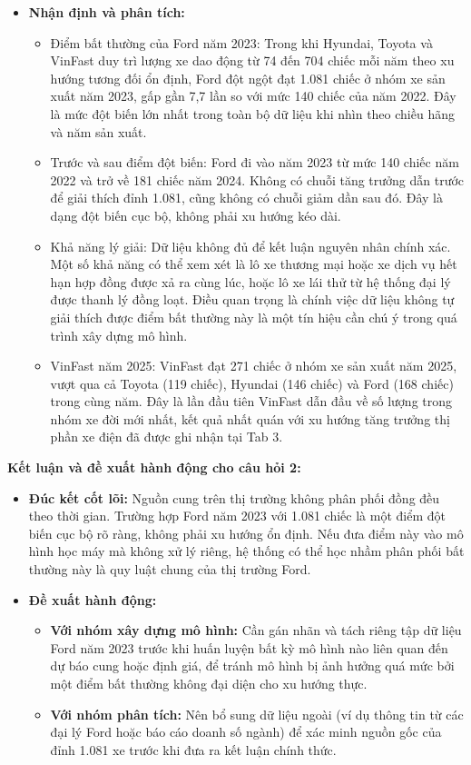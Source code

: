 \begin{itemize}
    \item \textbf{Nhận định và phân tích:}
    \begin{itemize}
        \item Điểm bất thường của Ford năm 2023: Trong khi Hyundai, Toyota và VinFast duy trì lượng xe dao động từ 74 đến 704 chiếc mỗi năm theo xu hướng tương đối ổn định, Ford đột ngột đạt 1.081 chiếc ở nhóm xe sản xuất năm 2023, gấp gần 7,7 lần so với mức 140 chiếc của năm 2022. Đây là mức đột biến lớn nhất trong toàn bộ dữ liệu khi nhìn theo chiều hãng và năm sản xuất.
        \item Trước và sau điểm đột biến: Ford đi vào năm 2023 từ mức 140 chiếc năm 2022 và trở về 181 chiếc năm 2024. Không có chuỗi tăng trưởng dẫn trước để giải thích đỉnh 1.081, cũng không có chuỗi giảm dần sau đó. Đây là dạng đột biến cục bộ, không phải xu hướng kéo dài.
        \item Khả năng lý giải: Dữ liệu không đủ để kết luận nguyên nhân chính xác. Một số khả năng có thể xem xét là lô xe thương mại hoặc xe dịch vụ hết hạn hợp đồng được xả ra cùng lúc, hoặc lô xe lái thử từ hệ thống đại lý được thanh lý đồng loạt. Điều quan trọng là chính việc dữ liệu không tự giải thích được điểm bất thường này là một tín hiệu cần chú ý trong quá trình xây dựng mô hình.
        \item VinFast năm 2025: VinFast đạt 271 chiếc ở nhóm xe sản xuất năm 2025, vượt qua cả Toyota (119 chiếc), Hyundai (146 chiếc) và Ford (168 chiếc) trong cùng năm. Đây là lần đầu tiên VinFast dẫn đầu về số lượng trong nhóm xe đời mới nhất, kết quả nhất quán với xu hướng tăng trưởng thị phần xe điện đã được ghi nhận tại Tab 3.
    \end{itemize}
\end{itemize}

\noindent\textbf{Kết luận và đề xuất hành động cho câu hỏi 2:}
\begin{itemize}
    \item \textbf{Đúc kết cốt lõi:} Nguồn cung trên thị trường không phân phối đồng đều theo thời gian. Trường hợp Ford năm 2023 với 1.081 chiếc là một điểm đột biến cục bộ rõ ràng, không phải xu hướng ổn định. Nếu đưa điểm này vào mô hình học máy mà không xử lý riêng, hệ thống có thể học nhầm phân phối bất thường này là quy luật chung của thị trường Ford.
    \item \textbf{Đề xuất hành động:}
    \begin{itemize}
        \item \textbf{Với nhóm xây dựng mô hình:} Cần gán nhãn và tách riêng tập dữ liệu Ford năm 2023 trước khi huấn luyện bất kỳ mô hình nào liên quan đến dự báo cung hoặc định giá, để tránh mô hình bị ảnh hưởng quá mức bởi một điểm bất thường không đại diện cho xu hướng thực.
        \item \textbf{Với nhóm phân tích:} Nên bổ sung dữ liệu ngoài (ví dụ thông tin từ các đại lý Ford hoặc báo cáo doanh số ngành) để xác minh nguồn gốc của đỉnh 1.081 xe trước khi đưa ra kết luận chính thức.
    \end{itemize}
\end{itemize}

